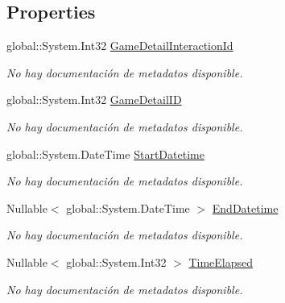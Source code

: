 \subsection*{Properties}
\begin{DoxyCompactItemize}
\item 
global\-::\-System.\-Int32 \hyperlink{class_game_memory_1_1_game_detail_interactions_a7c85d9badde12a4e6167757744640f52}{Game\-Detail\-Interaction\-Id}
\begin{DoxyCompactList}\small\item\em No hay documentación de metadatos disponible. \end{DoxyCompactList}\item 
global\-::\-System.\-Int32 \hyperlink{class_game_memory_1_1_game_detail_interactions_ae1bcee4700f49b55aa0a63ee376d1379}{Game\-Detail\-I\-D}
\begin{DoxyCompactList}\small\item\em No hay documentación de metadatos disponible. \end{DoxyCompactList}\item 
global\-::\-System.\-Date\-Time \hyperlink{class_game_memory_1_1_game_detail_interactions_a45ccc8af7e045eb3b85e25fda5251ef6}{Start\-Datetime}
\begin{DoxyCompactList}\small\item\em No hay documentación de metadatos disponible. \end{DoxyCompactList}\item 
Nullable$<$ global\-::\-System.\-Date\-Time $>$ \hyperlink{class_game_memory_1_1_game_detail_interactions_a021bedafc27dc63de5952facb05c6127}{End\-Datetime}
\begin{DoxyCompactList}\small\item\em No hay documentación de metadatos disponible. \end{DoxyCompactList}\item 
Nullable$<$ global\-::\-System.\-Int32 $>$ \hyperlink{class_game_memory_1_1_game_detail_interactions_a98537a11e123106e4197c9e163fcaa8c}{Time\-Elapsed}
\begin{DoxyCompactList}\small\item\em No hay documentación de metadatos disponible. \end{DoxyCompactList}\item 

\end{DoxyCompactItemize}
